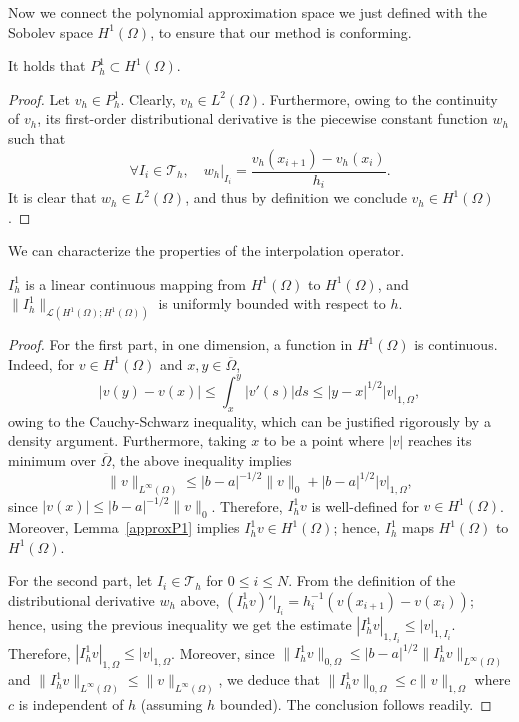Now we connect the polynomial approximation space we just defined with the Sobolev space $H^1(\Omega)$, to ensure that our method is conforming. 
\begin{lemma}\label{approxP1}
    It holds that $P_h^1 \subset H^1(\Omega)$.
    \begin{proof}
    Let $v_h \in P_h^1$. Clearly, $v_h \in L^2(\Omega)$. Furthermore, owing to the continuity of $v_h$, its first-order distributional derivative is the piecewise constant function $w_h$ such that
    \begin{equation*}
\forall I_i \in \mathcal{T}_h,\quad  w_h|_{I_i} = \frac{v_h(x_{i+1}) - v_h(x_i)}{h_i}.
\end{equation*}
    It is clear that $w_h\in L^2(\Omega)$, and thus by definition we conclude $v_h\in H^1(\Omega)$.
    \end{proof}
\end{lemma}
We can characterize the properties of the interpolation operator. 
\begin{lemma}\label{cont1D}
    $I_h^1$ is a linear continuous mapping from $H^1(\Omega)$ to $H^1(\Omega)$, and $\|I_h^1\|_{\mathcal{L}(H^1(\Omega);H^1(\Omega))}$ is uniformly bounded with respect to $h$.
    \begin{proof}
    For the first part, in one dimension, a function in $H^1(\Omega)$ is continuous. Indeed, for $v \in H^1(\Omega)$ and $x,y \in \overline{\Omega}$,
    \begin{equation}\label{eq:interpolator_continuity_1d}
        |v(y) - v(x)| \le \int_x^y |v'(s)| ds  \le |y-x|^{1/2} |v|_{1,\Omega},
    \end{equation}
    owing to the Cauchy-Schwarz inequality, which can be justified rigorously by a density argument. Furthermore, taking $x$ to be a point where $|v|$ reaches its minimum over $\overline{\Omega}$, the above inequality implies
    \begin{equation*}\label{eq:supnorm_p1}
        \|v\|_{L^\infty(\Omega)} \le |b-a|^{-1/2} \|v\|_0 + |b-a|^{1/2}|v|_{1,\Omega},
    \end{equation*}
    since $|v(x)| \le |b-a|^{-1/2} \|v\|_{0}$. Therefore, $I_h^1 v$ is well-defined for $v \in H^1(\Omega)$. Moreover, Lemma~\ref{approxP1} implies $I_h^1 v \in H^1(\Omega)$; hence, $I_h^1$ maps $H^1(\Omega)$ to $H^1(\Omega)$.

    For the second part, let $I_i \in \mathcal{T}_h$ for $0 \le i \le N$. From the definition of the distributional derivative $w_h$ above, $(I_h^1 v)'|_{I_i} = h_i^{-1}(v(x_{i+1}) - v(x_i))$; hence, using the previous inequality we get the estimate $|I_h^1 v|_{1,I_i} \le |v|_{1,I_i}$. Therefore, $|I_h^1 v|_{1,\Omega} \le |v|_{1,\Omega}$. Moreover, since $\|I_h^1 v\|_{0,\Omega} \le |b-a|^{1/2} \|I_h^1 v\|_{L^\infty(\Omega)}$ and $\|I_h^1 v\|_{L^\infty(\Omega)} \le \|v\|_{L^\infty(\Omega)}$, we deduce that $\|I_h^1 v\|_{0,\Omega} \le c \|v\|_{1,\Omega}$ where $c$ is independent of $h$ (assuming $h$ bounded). The conclusion follows readily.
    \end{proof}
\end{lemma}
